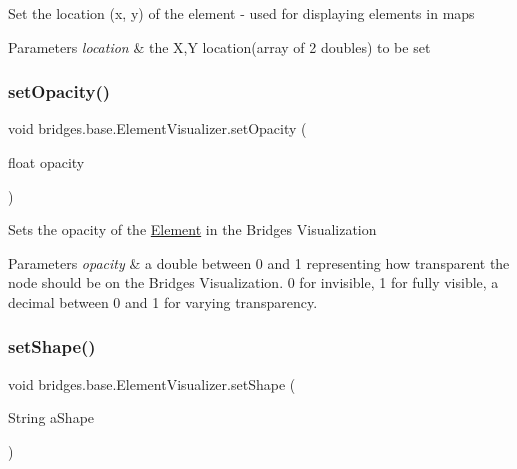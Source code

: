 Set the location (x, y) of the element -\/ used for displaying elements in maps


\begin{DoxyParams}{Parameters}
{\em location} & the X,Y location(array of 2 doubles) to be set \\
\hline
\end{DoxyParams}
\mbox{\label{classbridges_1_1base_1_1_element_visualizer_a932f62eb1bd0c92da265a7f903dd0790}} 
\subsubsection{\texorpdfstring{setOpacity()}{setOpacity()}}
{\footnotesize\ttfamily void bridges.\+base.\+Element\+Visualizer.\+set\+Opacity (\begin{DoxyParamCaption}\item[{float}]{opacity }\end{DoxyParamCaption})}

Sets the opacity of the \mbox{\hyperlink{classbridges_1_1base_1_1_element}{Element}} in the Bridges Visualization


\begin{DoxyParams}{Parameters}
{\em opacity} & a double between 0 and 1 representing how transparent the node should be on the Bridges Visualization. 0 for invisible, 1 for fully visible, a decimal between 0 and 1 for varying transparency. \\
\hline
\end{DoxyParams}
\mbox{\label{classbridges_1_1base_1_1_element_visualizer_ac3bad991904c8ad23e5233b341381d93}} 
\subsubsection{\texorpdfstring{setShape()}{setShape()}}
{\footnotesize\ttfamily void bridges.\+base.\+Element\+Visualizer.\+set\+Shape (\begin{DoxyParamCaption}\item[{String}]{a\+Shape }\end{DoxyParamCaption})}

